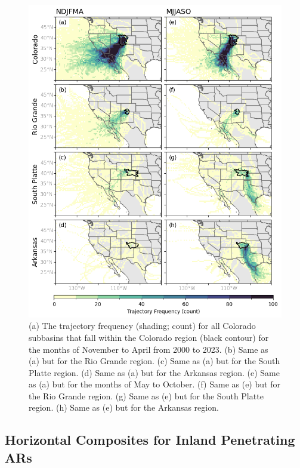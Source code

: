 \documentclass[draft]{agujournal2019}
\begin{document}
\begin{figure}
\noindent\includegraphics[width=\textwidth, height=\textheight, keepaspectratio]{fig4.png}
\caption{(a) The trajectory frequency (shading; count) for all Colorado subbasins that fall within the Colorado region (black contour) for the months of November to April from 2000 to 2023. (b) Same as (a) but for the Rio Grande region. (c) Same as (a) but for the South Platte region. (d) Same as (a) but for the Arkansas region. (e) Same as (a) but for the months of May to October. (f) Same as (e) but for the Rio Grande region. (g) Same as (e) but for the South Platte region. (h) Same as (e) but for the Arkansas region.}
\label{fig:heatmaps}
\end{figure}

\subsection{Horizontal Composites for Inland Penetrating ARs}
\label{sec:results:composite_analysis}
\end{document}
